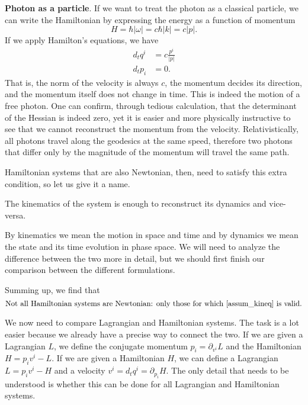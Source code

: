 \textbf{Photon as a particle}. If we want to treat the photon as a classical particle, we can write the Hamiltonian by expressing the energy as a function of momentum
\begin{equation}
	H=\hbar | \omega| = c \hbar |k| = c |p|.
\end{equation}
If we apply Hamilton's equations, we have
\begin{equation}
	\begin{aligned}
		d_t q^i &= c \frac{p^i}{|p|} \\
		d_t p_i &= 0.
	\end{aligned}
\end{equation}
That is, the norm of the velocity is always $c$, the momentum decides its direction, and the momentum itself does not change in time. This is indeed the motion of a free photon. One can confirm, through tedious calculation, that the determinant of the Hessian is indeed zero, yet it is easier and more physically instructive to see that we cannot reconstruct the momentum from the velocity. Relativistically, all photons travel along the geodesics at the same speed, therefore two photons that differ only by the magnitude of the momentum will travel the same path.

Hamiltonian systems that are also Newtonian, then, need to satisfy this extra condition, so let us give it a name.
\renewcommand{\theassump}{KE}%
\begin{assump}\label{assum_kineq}
	The kinematics of the system is enough to reconstruct its dynamics and vice-versa.
\end{assump}
\renewcommand{\theassump}{\Roman{assump}}%
By kinematics we mean the motion in space and time and by dynamics we mean the state and its time evolution in phase space. We will need to analyze the difference between the two more in detail, but we should first finish our comparison between the different formulations.

Summing up, we find that
\begin{equation}
	\textrm{Not all Hamiltonian systems are Newtonian: only those for which  \ref{assum_kineq} is valid.}
\end{equation}


We now need to compare Lagrangian and Hamiltonian systems. The task is a lot easier because we already have a precise way to connect the two. If we are given a Lagrangian $L$, we define the conjugate momentum $p_i = \partial_{v^i} L$ and the Hamiltonian $H = p_i v^i - L$. If we are given a Hamiltonian $H$, we can define a Lagrangian $L = p_i v^i - H$ and a velocity $v^i = d_t q^i = \partial_{p_i} H$. The only detail that needs to be understood is whether this can be done for all Lagrangian and Hamiltonian systems.

